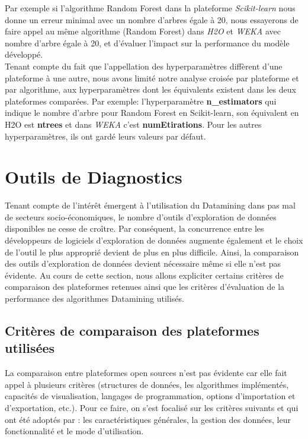 Par exemple si l'algorithme Random Forest dans la plateforme \textit{Scikit-learn} nous donne un erreur minimal avec un nombre d'arbres égale à 20, nous essayerons de faire appel au même algorithme (Random Forest) dans \textit{H2O} et \textit{WEKA} avec nombre d'arbre égale à 20, et d'évaluer l'impact sur la performance du modèle développé.\\

Tenant compte du fait que l'appellation des hyperparamètres diffèrent d'une plateforme à une autre, nous avons limité notre analyse croisée par plateforme et par algorithme, aux hyperparamètres dont les équivalents existent dans les deux plateformes comparées. Par exemple: l'hyperparamètre  \textbf{n\_estimators} qui indique le nombre d'arbre pour Random Forest en Scikit-learn, son équivalent en H2O est \textbf{ntrees} et dans \textit{WEKA} c'est \textbf{numEtirations}. Pour les autres hyperparamètres, ils ont gardé leurs valeurs par défaut. 


\section{Outils de Diagnostics }
Tenant compte de l'intérêt émergent à l'utilisation du Datamining dans pas mal de secteurs socio-économiques, le nombre d’outils d’exploration de données disponibles ne cesse de croître. Par conséquent, la concurrence entre les développeurs de logiciels d'exploration de données augmente également et le choix de l'outil le plus approprié devient de plus en plus difficile. Ainsi, la comparaison des outils d'exploration de données devient nécessaire même si elle n'est pas évidente. Au cours de cette section, nous allons expliciter certains critères de comparaison des plateformes retenues ainsi que les critères d'évaluation de la performance des algorithmes Datamining utilisés.

\subsection{Critères de comparaison des plateformes utilisées}
La comparaison entre plateformes open sources n'est pas évidente car elle fait appel à plusieurs critères (structures de données, les algorithmes implémentés, capacités de visualisation, langages de programmation, options d'importation et d'exportation, etc.). Pour ce faire, on s'est focalisé sur les critères suivants et qui ont été adoptés par \cite{chen2007survey} : les caractéristiques générales, la gestion des données, leur fonctionnalité et le mode d'utilisation.\\

